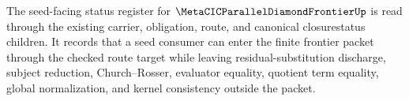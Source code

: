 The seed-facing status register for $\MetaCICParallelDiamondFrontierUp$ is read through the existing carrier, obligation, route, and canonical closurestatus children. It records that a seed consumer can enter the finite frontier packet through the checked route target while leaving residual-substitution discharge, subject reduction, Church--Rosser, evaluator equality, quotient term equality, global normalization, and kernel consistency outside the packet.
